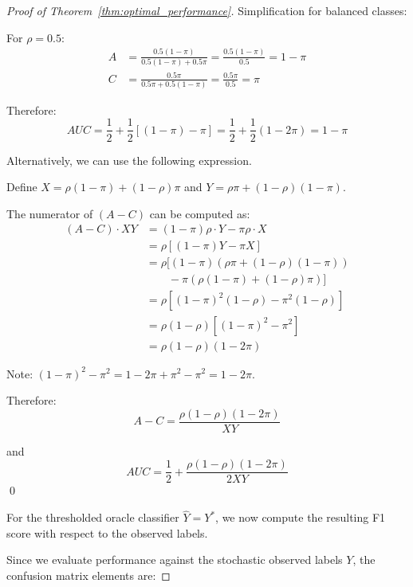 \documentclass[fullpaper]{nldl}
\theoremstyle{plain}
\theoremstyle{definition}
\theoremstyle{remark}
\begin{document}
\begin{proof}[Proof of Theorem~\ref{thm:optimal_performance}]
Simplification for balanced classes:

For $\rho = 0.5$:
\begin{align}
A &= \frac{0.5(1-\pi)}{0.5(1-\pi) + 0.5\pi} = \frac{0.5(1-\pi)}{0.5} = 1-\pi \\
C &= \frac{0.5\pi}{0.5\pi + 0.5(1-\pi)} = \frac{0.5\pi}{0.5} = \pi
\end{align}

Therefore:
\begin{equation}
AUC = \frac{1}{2} + \frac{1}{2}[(1-\pi) - \pi] = \frac{1}{2} + \frac{1}{2}(1-2\pi) = 1 - \pi
\end{equation}

Alternatively, we can use the following expression.

Define $X = \rho(1-\pi) + (1-\rho)\pi$ and $Y = \rho \pi + (1-\rho)(1-\pi)$.

The numerator of $(A - C)$ can be computed as:
\begin{align}
(A - C) \cdot XY &= (1-\pi)\rho \cdot Y - \pi\rho \cdot X \\
&= \rho[(1-\pi)Y - \pi X] \\
&= \rho[(1-\pi)(\rho \pi + (1-\rho)(1-\pi)) \\
&\qquad - \pi(\rho(1-\pi) + (1-\rho)\pi)] \\
&= \rho[(1-\pi)^2(1-\rho) - \pi^2(1-\rho)] \\
&= \rho(1-\rho)[(1-\pi)^2 - \pi^2] \\
&= \rho(1-\rho)(1-2\pi)
\end{align}

Note: $(1-\pi)^2 - \pi^2 = 1 - 2\pi + \pi^2 - \pi^2 = 1 - 2\pi$.

Therefore:
\begin{equation}
A - C = \frac{\rho(1-\rho)(1-2\pi)}{XY}
\end{equation}

and
\begin{equation}
AUC = \frac{1}{2} + \frac{\rho(1-\rho)(1-2\pi)}{2XY}
\end{equation}
\qed

For the thresholded oracle classifier $\widehat{Y}=Y^{*}$, we now compute the resulting F1 score with respect to the observed labels.

Since we evaluate performance against the stochastic observed labels $Y$, the confusion matrix elements are:


\end{proof}
\end{document}
